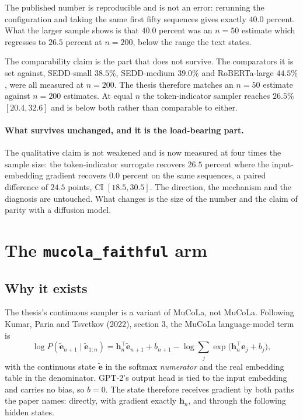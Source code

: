 \documentclass[11pt,a4paper]{article}
\newcommand{\ve}{\bm{e}}
\newcommand{\vh}{\bm{h}}
\begin{document}
The published number is reproducible and is not an error: rerunning the configuration
and taking the same first fifty sequences gives exactly $40.0$ percent. What the larger
sample shows is that $40.0$ percent was an $n=50$ estimate which regresses to $26.5$
percent at $n=200$, below the range the text states.

The comparability claim is the part that does not survive. The comparators it is set
against, SEDD-small $38.5\%$, SEDD-medium $39.0\%$ and RoBERTa-large $44.5\%$, were all
measured at $n=200$. The thesis therefore matches an $n=50$ estimate against $n=200$
estimates. At equal $n$ the token-indicator sampler reaches $26.5\%$ $[20.4, 32.6]$ and
is below both rather than comparable to either.

\paragraph{What survives unchanged, and it is the load-bearing part.}
The qualitative claim is not weakened and is now measured at four times the sample size:
the token-indicator surrogate recovers $26.5$ percent where the input-embedding gradient
recovers $0.0$ percent on the same sequences, a paired difference of $24.5$ points, CI
$[18.5, 30.5]$. The direction, the mechanism and the diagnosis are untouched. What
changes is the size of the number and the claim of parity with a diffusion model.

\section{The \texttt{mucola\_faithful} arm}

\subsection{Why it exists}

The thesis's continuous sampler is a variant of MuCoLa, not MuCoLa. Following Kumar,
Paria and Tsvetkov (2022), section 3, the MuCoLa language-model term is
\[
  \log P(\tilde{\ve}_{n+1} \mid \tilde{\ve}_{1:n})
  = \vh_n^\top \tilde{\ve}_{n+1} + b_{n+1}
    - \log \sum_j \exp\!\big(\vh_n^\top \ve_j + b_j\big),
\]
with the continuous state $\tilde{\ve}$ in the softmax \emph{numerator} and the real
embedding table in the denominator. GPT-2's output head is tied to the input embedding
and carries no bias, so $b=0$. The state therefore receives gradient by both paths the
paper names: directly, with gradient exactly $\vh_n$, and through the following hidden
states.
\end{document}
